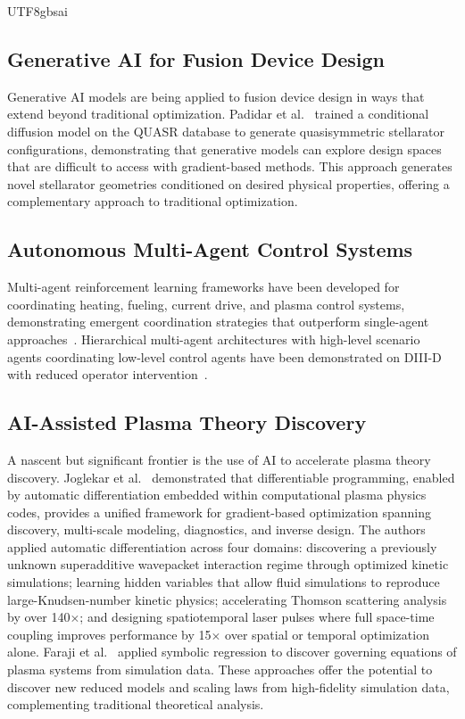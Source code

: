 \documentclass[12pt,a4paper]{article}
\begin{document}
\begin{CJK}{UTF8}{gbsai}
\subsection{Generative AI for Fusion Device Design}

Generative AI models are being applied to fusion device design in ways that extend beyond traditional optimization. Padidar et al.~\citep{Padidar2025} trained a conditional diffusion model on the QUASR database to generate quasisymmetric stellarator configurations, demonstrating that generative models can explore design spaces that are difficult to access with gradient-based methods. This approach generates novel stellarator geometries conditioned on desired physical properties, offering a complementary approach to traditional optimization.

\subsection{Autonomous Multi-Agent Control Systems}

Multi-agent reinforcement learning frameworks have been developed for coordinating heating, fueling, current drive, and plasma control systems, demonstrating emergent coordination strategies that outperform single-agent approaches~\citep{Char2024FEC}. Hierarchical multi-agent architectures with high-level scenario agents coordinating low-level control agents have been demonstrated on DIII-D with reduced operator intervention~\citep{Rath2025}.

\subsection{AI-Assisted Plasma Theory Discovery}

A nascent but significant frontier is the use of AI to accelerate plasma theory discovery. Joglekar et al.~\citep{Joglekar2026} demonstrated that differentiable programming, enabled by automatic differentiation embedded within computational plasma physics codes, provides a unified framework for gradient-based optimization spanning discovery, multi-scale modeling, diagnostics, and inverse design. The authors applied automatic differentiation across four domains: discovering a previously unknown superadditive wavepacket interaction regime through optimized kinetic simulations; learning hidden variables that allow fluid simulations to reproduce large-Knudsen-number kinetic physics; accelerating Thomson scattering analysis by over 140$\times$; and designing spatiotemporal laser pulses where full space-time coupling improves performance by 15$\times$ over spatial or temporal optimization alone. Faraji et al.~\citep{Faraji2025} applied symbolic regression to discover governing equations of plasma systems from simulation data. These approaches offer the potential to discover new reduced models and scaling laws from high-fidelity simulation data, complementing traditional theoretical analysis.


\end{CJK}
\end{document}

